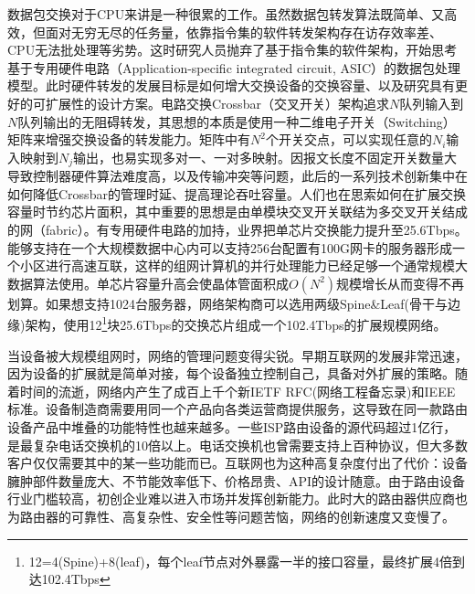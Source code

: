 
数据包交换对于CPU来讲是一种很累的工作。虽然数据包转发算法既简单、又高效，但面对无穷无尽的任务量，依靠指令集的软件转发架构存在访存效率差、CPU无法批处理等劣势。这时研究人员抛弃了基于指令集的软件架构，开始思考基于专用硬件电路（Application-specific integrated circuit, ASIC）的数据包处理模型。此时硬件转发的发展目标是如何增大交换设备的交换容量、以及研究具有更好的可扩展性的设计方案。电路交换Crossbar（交叉开关）架构追求$N$队列输入到$N$队列输出的无阻碍转发，其思想的本质是使用一种二维电子开关（Switching）矩阵来增强交换设备的转发能力。矩阵中有$N^2$个开关交点，可以实现任意的$N_i$输入映射到$N_j$输出，也易实现多对一、一对多映射。因报文长度不固定开关数量大导致控制器硬件算法难度高，以及传输冲突等问题，此后的一系列技术创新集中在如何降低Crossbar的管理时延、提高理论吞吐容量。人们也在思索如何在扩展交换容量时节约芯片面积，其中重要的思想是由单模块交叉开关联结为多交叉开关结成的网（fabric）。有专用硬件电路的加持，业界把单芯片交换能力提升至25.6Tbps。能够支持在一个大规模数据中心内可以支持256台配置有100G网卡的服务器形成一个小区进行高速互联，这样的组网计算机的并行处理能力已经足够一个通常规模大数据算法使用。单芯片容量升高会使晶体管面积成$O(N^2)$规模增长从而变得不再划算。如果想支持1024台服务器，网络架构商可以选用两级Spine\&Leaf(骨干与边缘)架构，使用12\footnote{12=4(Spine)+8(leaf)，每个leaf节点对外暴露一半的接口容量，最终扩展4倍到达102.4Tbps}块25.6Tbps的交换芯片组成一个102.4Tbps的扩展规模网络。

当设备被大规模组网时，网络的管理问题变得尖锐。早期互联网的发展非常迅速，因为设备的扩展就是简单对接，每个设备独立控制自己，具备对外扩展的策略。随着时间的流逝，网络内产生了成百上千个新IETF RFC(网络工程备忘录)和IEEE标准。设备制造商需要用同一个产品向各类运营商提供服务，这导致在同一款路由设备产品中堆叠的功能特性也越来越多。一些ISP路由设备的源代码超过1亿行，是最复杂电话交换机的10倍以上。电话交换机也曾需要支持上百种协议，但大多数客户仅仅需要其中的某一些功能而已。互联网也为这种高复杂度付出了代价：设备臃肿部件数量庞大、不节能效率低下、价格昂贵、API的设计随意。由于路由设备行业门槛较高，初创企业难以进入市场并发挥创新能力。此时大的路由器供应商也为路由器的可靠性、高复杂性、安全性等问题苦恼，网络的创新速度又变慢了。




